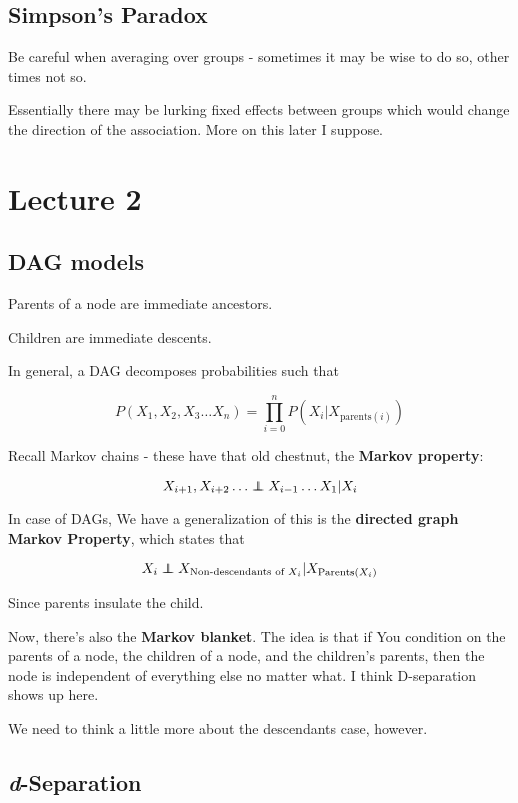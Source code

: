 \documentclass{article}
\newcommand\independent{\protect\mathpalette{\protect\independenT}{\perp}}
\def\independenT#1#2{\mathrel{\rlap{$#1#2$}\mkern2mu{#1#2}}}
\begin{document}
	\subsection{Simpson's Paradox}
	
		Be careful when averaging over groups - sometimes it may be wise to do so, other times not so. 
		
		Essentially there may be lurking fixed effects between groups which would change the direction of the association. More on this later I suppose.
		
\section{Lecture 2}

	\subsection{DAG models}
	
		Parents of a node are immediate ancestors. 
		
		Children are immediate descents.
		
		In general, a DAG decomposes probabilities such that
		
		\[ P(X_1, X_2, X_3\ldots X_n) = \prod^n_{i=0} P(X_i | X_{\text{parents}(i)}) \]

		Recall Markov chains - these have that old chestnut, the \textbf{Markov property}:
		
		\[ X_{i+1}, X_{i+2}\ldots \independent  X_{i-1}\ldots X_1 | X_i\]
		
		In case of DAGs, We have a generalization of this is the \textbf{directed graph Markov Property}, which states that
		
		\[ X_i \independent X_{\text{Non-descendants of }X_i} | X_{\text{Parents}(X_i)} \]
		
		Since parents insulate the child.
		
		Now, there's also the \textbf{Markov blanket}. The idea is that if You condition on the parents of a node, the children of a node, and the children's parents, then the node is independent of everything else no matter what. I think D-separation shows up here.
		
		We need to think a little more about the descendants case, however.
		
		
	\subsection{\textit{d}-Separation}
	
\end{document}
